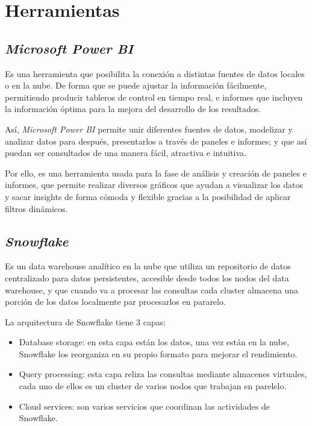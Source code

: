 \section{Herramientas}
\subsection{\emph{Microsoft Power BI}}
\cite{MPBI} Es una herramienta que posibilita la conexión a distintas fuentes de datos locales o en la nube. De forma que se puede ajustar la información fácilmente, permitiendo producir tableros de control en tiempo real, e informes que incluyen la información óptima para la mejora del desarrollo de los resultados.
	
Así, \emph{Microsoft Power BI} permite unir diferentes fuentes de datos, modelizar y analizar datos para después, presentarlos a través de paneles e informes; y que así puedan ser consultados de una manera fácil, atractiva e intuitiva.
	
Por ello, es una herramienta usada para la fase de análisis y creación de paneles e informes, que permite realizar diversos gráficos que ayudan a visualizar los datos y sacar insights de forma cómoda y flexible gracias a la posibilidad de aplicar filtros dinámicos. 

\subsection{\emph{Snowflake}}
\cite{Snowflake} Es un data warehouse analítico en la nube que utiliza un repositorio de datos centralizado para datos persistentes, accesible desde todos los nodos del data warehouse, y que cuando va a procesar las consultas cada cluster almacena una porción de los datos localmente par procesarlos en pararelo.

La arquitectura de Snowflake tiene 3 capas:

\begin{itemize}
	\item Database storage: en esta capa están los datos, una vez están en la nube, Snowflake los reorganiza en su propio formato para mejorar el rendimiento.
	\item Query processing: esta capa reliza las consultas mediante almacenes virtuales, cada uno de ellos es un cluster de varios nodos que trabajan en parelelo.
	\item Cloud services: son varios servicios que coordinan las actividades de Snowflake.
\end{itemize}

